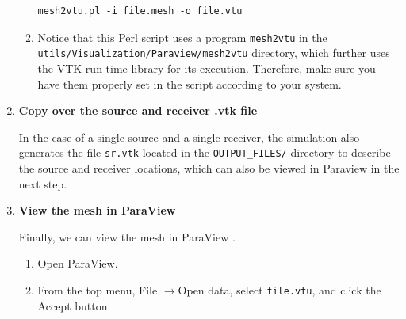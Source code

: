 \begin{enumerate}
\begin{enumerate}
{\footnotesize
\begin{verbatim}
mesh2vtu.pl -i file.mesh -o file.vtu
\end{verbatim}
}

\item Notice that this Perl script uses a program \texttt{mesh2vtu} in the
\texttt{\small utils/Visualization/Paraview/mesh2vtu} directory, which further
uses the VTK  run-time library
for its execution. Therefore, make sure you have them properly set
in the script according to your system.
\end{enumerate}

\item \textbf{Copy over the source and receiver .vtk file}


In the case of a single source and a single receiver, the simulation
also generates the file \texttt{sr.vtk} located in the \texttt{OUTPUT\_FILES/}
directory to describe the source and receiver locations, which can
also be viewed in Paraview in the next step.

\item \textbf{View the mesh in ParaView}


Finally, we can view the mesh in ParaView .
\begin{enumerate}
\item Open ParaView.
\item From the top menu, \textsf{File} $\rightarrow$\textsf{Open data},
select \texttt{file.vtu}, and click the \textsf{Accept} button.


\end{enumerate}
\end{enumerate}
